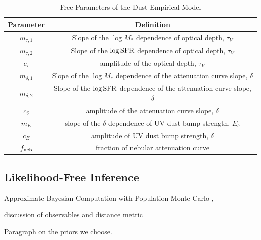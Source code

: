 \begin{table}
    \caption{Free Parameters of the Dust Empirical Model} 
    \begin{center}
        \begin{tabular}{cc} \toprule
            Parameter & Definition \\[3pt] \hline\hline
            $m_{\tau,1}$ & Slope of the $\log M_*$ dependence of optical depth, $\tau_V$\\
            $m_{\tau,2}$ & Slope of the $\log {\rm SFR}$ dependence of optical depth, $\tau_V$\\
            $c_{\tau}$ & amplitude of the optical depth, $\tau_V$\\
            $m_{\delta,1}$ & Slope of the $\log M_*$ dependence of the attenuation curve slope, $\delta$\\
            $m_{\delta,2}$ & Slope of the $\log {\rm SFR}$ dependence of the attenuation curve slope, $\delta$\\
            $c_{\delta}$ & amplitude of the attenuation curve slope, $\delta$\\
            $m_{E}$ & slope of the $\delta$ dependence of UV dust bump strength, $E_b$\\
            $c_{E}$ & amplitude of UV dust bump strength, $\delta$\\
            $f_{\rm neb}$ & fraction of nebular attenuation curve\\
            \hline
        \end{tabular} \label{tab:free_param}
    \end{center}
\end{table}

\subsection{Likelihood-Free Inference} 
Approximate Bayesian Computation with Population Monte Carlo \cite{hahn2017a},

discussion of observables and distance metric 
\cite{ishida2015} 

Paragraph on the priors we choose. 

